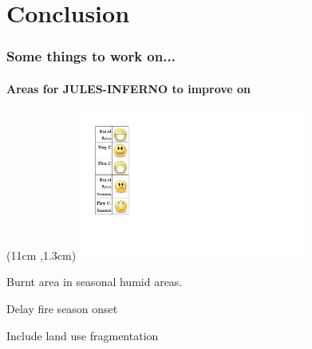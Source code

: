 \section{Conclusion}


\begin{frame}
    \frametitle{Some things to work on...}
    \framesubtitle{Areas for JULES-INFERNO to improve on}
    
    \begin{textblock*}{8cm}(11cm ,1.3cm)
    	\includegraphics[width=7.5cm]{images/Smileys/All.png}
    \end{textblock*}
    
	\begin{itemize}
		\large{
			\item Burnt area in seasonal humid areas.
			\item Delay fire season onset
			\item Include land use fragmentation
		}
	\end{itemize}
\end{frame}


